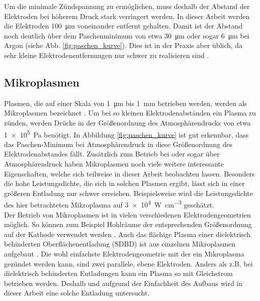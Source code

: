 Um die minimale Zündspannung zu ermöglichen, muss deshalb der Abstand der Elektroden bei höherem Druck stark verringert werden. In dieser Arbeit werden die Elektroden \qty{100}{\um} voneinander entfernt gehalten. Damit ist der Abstand noch deutlich über dem Paschenminimum von etwa \qty{30}{\um} oder sogar \qty{6}{\um} bei Argon (siehe Abb. \ref{fig:paschen_kurve}). Dies ist in der Praxis aber üblich, da sehr kleine Elektrodenentfernungen nur schwer zu realisieren sind \cite{bruggemanFoundationsAtmosphericPressure2017}.

\subsection{Mikroplasmen}

Plasmen, die auf einer Skala von \qty{1}{\um} bis \qty{1}{\mm} betrieben werden, werden als Mikroplasmen bezeichnet \cite{edenMicrocavityPlasmaDevices2005}. Um bei so kleinen Elektrodenabständen ein Plasma zu zünden, werden Drücke in der Größenordnung des Atmosphärendrucks von etwa \qty{1e5}{\Pa} benötigt. In Abbildung \ref{fig:paschen_kurve} ist gut erkennbar, dass das Paschen-Minimum bei Atmosphärendruck in diese Größenordnung des Elektrodenabstandes fällt. Zusätzlich zum Betrieb bei oder sogar über Atmosphärendruck haben Mikroplasmen noch viele weitere interessante Eigenschaften, welche sich teilweise in dieser Arbeit beobachten lassen. Besonders die hohe Leistungsdichte, die sich in solchen Plasmen ergibt, lässt sich in einer größeren Entladung nur schwer erreichen. Beispielsweise wird die Leistungsdichte des hier betrachteten Mikroplasma auf \qty{3e4}{W.cm^{-3}} geschätzt.\\

Der Betrieb von Mikroplasmen ist in vielen verschiedenen Elektrodengeometrien möglich. So können zum Beispiel Hohlräume der entsprechenden Größenordnung auf der Kathode verwendet werden \cite{dzikowskiElectricFieldStrengths2022}. Auch das flächige Plasma einer dielektrisch behinderten Oberflächenentladung (SDBD) ist aus einzelnen Mikroplasmen aufgebaut \cite{hoderComplexInteractionSubsequent2017}. Die wohl einfachste Elektrodengeometrie mit der ein Mikroplasma gezündet werden kann, sind zwei parallele, ebene Elektroden. Anders als z.B. bei dielektrisch behinderten Entladungen kann ein Plasma so mit Gleichstrom betrieben werden. Deshalb und aufgrund der Einfachheit des Aufbaus wird in dieser Arbeit eine solche Entladung untersucht.

